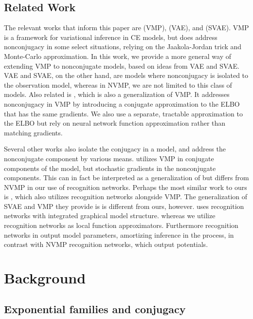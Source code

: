 \subsection{Related Work}
The relevant works that inform this paper are
\cite{vmp} (VMP), \cite{vae} (VAE), and \cite{svae} (SVAE). 
VMP is a framework for variational inference
in CE models, but does
address nonconjugacy in some select situations,
relying on the Jaakola-Jordan trick \cite{jaakola}
and Monte-Carlo approximation.
In this work, we provide a more general way of extending VMP
to nonconjugate models, based on ideas
from VAE and SVAE. VAE and SVAE,
on the other hand, are models
where nonconjugacy is isolated to the observation model,
whereas in NVMP, we are not limited to this class of models.
Also related is \cite{ncvmp},
which is also a generalization of VMP.
It addresses nonconjugacy in VMP
by introducing a conjugate approximation
to the ELBO
that has the same gradients.
We also use a separate, tractable approximation
to the ELBO but rely on neural network
function approximation rather than matching gradients.

Several other works also
isolate the conjugacy in a model,
and address the nonconjugate component
by various means.
\cite{khan1} utilizes VMP
in conjugate components of the model, but stochastic
gradients in the nonconjugate components. This can in fact
be interpreted as a generalization of \cite{ncvmp}
but differs from NVMP in our use of recognition networks.
Perhaps the most similar work to ours
is \cite{khaaann}, which also utilizes recognition networks
alongside VMP.
The generalization of SVAE and VMP they provide is
is different from ours, however.
\cite{khaaann} uses recognition networks
with integrated graphical model structure.
whereas
we utilize recognition networks as local
function approximators.
Furthermore recognition
networks in \cite{khaaann} output model parameters,
amortizing inference in the process, in contrast with
NVMP recognition networks, which output potentials.

\section{Background}
\label{sec:background}

\subsection{Exponential families and conjugacy}

